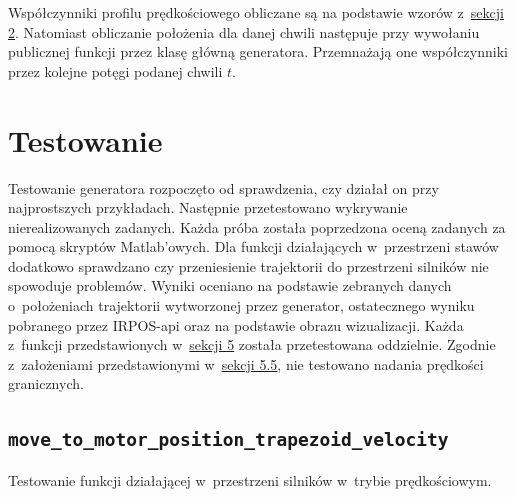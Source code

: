 \documentclass[a4paper, 12pt]{article}
\begin{document}
	\par Współczynniki profilu prędkościowego obliczane są na podstawie wzorów z~\hyperref[sec:math]{sekcji 2}. Natomiast obliczanie położenia dla danej chwili następuje przy wywołaniu publicznej funkcji przez klasę główną generatora. Przemnażają one współczynniki przez kolejne potęgi podanej chwili $t$.
	
	\section{Testowanie}
	Testowanie generatora rozpoczęto od sprawdzenia, czy działał on przy najprostszych przykładach. Następnie przetestowano wykrywanie nierealizowanych zadanych. Każda próba została poprzedzona oceną zadanych za pomocą skryptów Matlab'owych. Dla funkcji działających w~przestrzeni stawów dodatkowo sprawdzano czy przeniesienie trajektorii do przestrzeni silników nie spowoduje problemów. Wyniki oceniano na podstawie zebranych danych o~położeniach trajektorii wytworzonej przez generator, ostatecznego wyniku pobranego przez IRPOS-api oraz na podstawie obrazu wizualizacji. Każda z~funkcji przedstawionych w~\hyperref[sec:api]{sekcji 5} została przetestowana oddzielnie. Zgodnie z~założeniami przedstawionymi w~\hyperref[sec:borderVels]{sekcji 5.5}, nie testowano nadania prędkości granicznych.
	\subsection{\texttt{move\_to\_motor\_position\_trapezoid\_velocity}}
	Testowanie funkcji działającej w~przestrzeni silników w~trybie prędkościowym.
\end{document}
